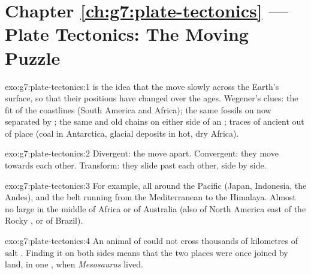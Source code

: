 \section*{Chapter \ref{ch:g7:plate-tectonics} --- Plate Tectonics: The Moving Puzzle}

\begin{solution}{exo:g7:plate-tectonics:1}
 is the idea that the  move slowly across the
Earth's surface, so that their positions have changed over the ages.
Wegener's clues: the fit of the coastlines (South America and Africa); the
same fossils on  now separated by ; the same  and old
 chains on either side of an ; traces of ancient  out
of place (coal in Antarctica, glacial deposits in hot, dry Africa).
\end{solution}

\begin{solution}{exo:g7:plate-tectonics:2}
Divergent: the  move apart. Convergent: they move towards each other.
Transform: they slide past each other, side by side.
\end{solution}

\begin{solution}{exo:g7:plate-tectonics:3}
For example, all around the Pacific  (Japan, Indonesia, the Andes),
and the belt running from the Mediterranean to the Himalaya. Almost no
large  in the middle of Africa or of Australia (also of North
America east of the Rocky , or of Brazil).
\end{solution}

\begin{solution}{exo:g7:plate-tectonics:4}
An animal of  could not cross thousands of kilometres of salt
. Finding it on both sides means that the two places were once joined
by land, in one , when \emph{Mesosaurus} lived.
\end{solution}

